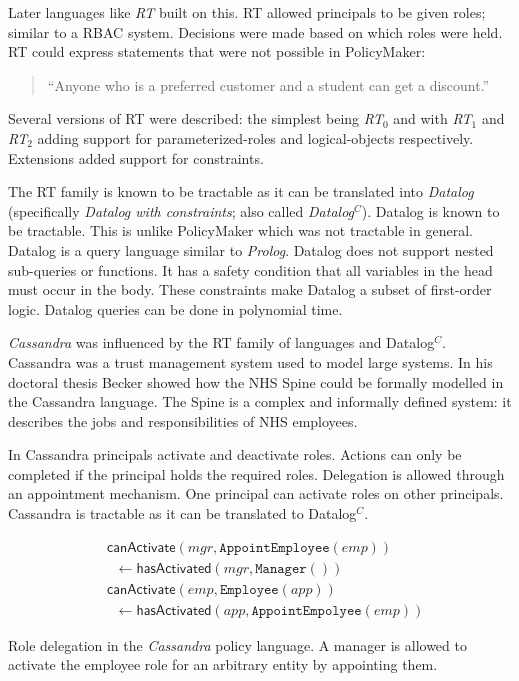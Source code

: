 \documentclass[a4paper,sfsidenotes]{tufte-book}
\begin{document}
Later languages like \emph{RT}\cite{Li:2002if} built on this. RT allowed
principals to be given roles; similar to a \ac{RBAC} system. Decisions
were made based on which roles were held. RT could express statements
that were not possible in PolicyMaker: \begin{quote} ``Anyone who is a
  preferred customer and a student can get a discount.'' \end{quote} Several
versions of RT were described: the simplest being \emph{RT$_0$}\cite{Li:2003tj}
and with \emph{RT$_1$} and \emph{RT$_2$} adding support for parameterized-roles
and logical-objects respectively. Extensions added support for constraints.

The RT family is known to be tractable as it can be translated into
\emph{Datalog} (specifically \emph{Datalog with constraints}; also called
\emph{Datalog$^C$\cite{Li:2003ix}}).  Datalog is known to be tractable. This is
unlike PolicyMaker which was not tractable in general. Datalog is a query
language similar to \emph{Prolog}. Datalog does not support nested sub-queries
or functions. It has a safety condition that all variables in the head must
occur in the body. These constraints make Datalog a subset of first-order logic.
Datalog queries can be done in polynomial time.

\emph{Cassandra}\cite{Becker:2004fi} was influenced by the RT family of
languages and Datalog$^C$.  Cassandra was a trust management system used to
model large systems.  In his doctoral thesis Becker showed how the NHS Spine
could be formally modelled in the Cassandra language.  The Spine is a complex
and informally defined system: it describes the jobs and responsibilities of NHS
employees.

In Cassandra principals activate and deactivate roles. Actions can only be completed if the
principal holds the required roles. Delegation is allowed through an
appointment mechanism. One principal can activate roles on other
principals. Cassandra is tractable as it can be translated
to Datalog$^C$.

\begin{marginfigure}\label{code:cassandra}
  \begin{align*}
    &\textsf{canActivate}(mgr, \texttt{AppointEmployee}(emp)) \\
    &\;\;\gets \textsf{hasActivated}(mgr, \texttt{Manager}()) \\
    &\textsf{canActivate}(emp, \texttt{Employee}(app)) \\
    &\;\;\gets \textsf{hasActivated}(app, \texttt{AppointEmpolyee}(emp))
  \end{align*}
  \caption{Role delegation in the \emph{Cassandra} policy language. A manager is
  allowed to activate the employee role for an arbitrary entity by appointing
  them.}
\end{marginfigure}
\end{document}
